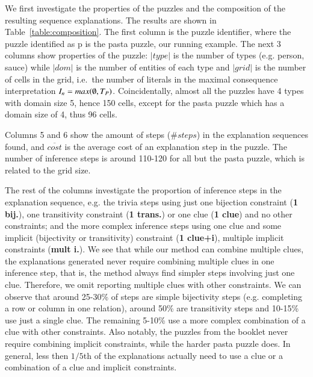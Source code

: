 We first investigate the properties of the puzzles and the composition of the resulting sequence explanations. The results are shown in Table~\ref{table:composition}. The first column is the puzzle identifier, where the puzzle identified as p is the pasta puzzle, our running example. 
The next 3 columns show properties of the puzzle:
$|type|$ is the number of types (e.g. person, sauce) while $|dom|$ is the number of entities of each type and $|grid|$ is the number of cells in the grid, i.e.\ the number of literals in the maximal consequence interpretation $I_n=max(\emptyset, T_P)$.
Coincidentally, almost all the puzzles have 4 types with domain size 5,  hence 150 cells, except for the pasta puzzle which has a domain size of 4, thus 96 cells.

Columns 5 and 6 show the amount of steps ($\# steps$) in the explanation sequences found, and $\overline{cost}$ is the average cost of an explanation step in the puzzle. The number of inference steps is around 110-120 for all but the pasta puzzle, which is related to the grid size.

The rest of the columns investigate the proportion of inference steps in the explanation sequence, e.g. the trivia steps using just one bijection constraint (\textbf{1 bij.}), one transitivity constraint (\textbf{1 trans.}) or one clue (\textbf{1 clue}) and no other constraints; and the more complex inference steps using one clue and some implicit (bijectivity or transitivity) constraint (\textbf{1 clue+i}), multiple implicit constraints (\textbf{mult i.}). 
We see that while our method can combine multiple clues, the explanations generated never require combining multiple clues in one inference step, that is, the method always find simpler steps involving just one clue. 
Therefore, we omit reporting multiple clues with other constraints. 
We can observe that around 25-30\% of steps are simple bijectivity steps (e.g. completing a row or column in one relation), around 50\% are transitivity steps and 10-15\% use just a single clue. 
The remaining 5-10\% use a more complex combination of a clue with other constraints. 
Also notably, the puzzles from the booklet never require combining implicit constraints, while the harder pasta puzzle does. 
In general, less then $1/5$th of the explanations actually need to use a clue or a combination of a clue and implicit constraints.

